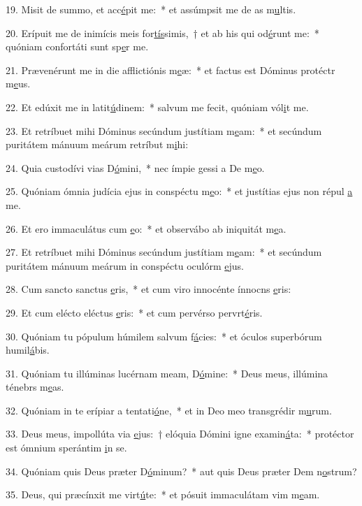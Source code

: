 19. Misit de summo, et acc\uline{é}pit me:~* et assúmpsit me de as m\uline{u}ltis.\par 
20. Erípuit me de inimícis meis for\uline{tís}simis,~† et ab his qui od\uline{é}runt me:~* quóniam confortáti sunt sp\uline{e}r me.\par 
21. Prævenérunt me in die afflictiónis m\uline{e}æ:~* et factus est Dóminus protéctr m\uline{e}us.\par 
22. Et edúxit me in latit\uline{ú}dinem:~* salvum me fecit, quóniam vól\uline{i}t me.\par 
23. Et retríbuet mihi Dóminus secúndum justítiam m\uline{e}am:~* et secúndum puritátem mánuum meárum retríbut m\uline{i}hi:\par 
24. Quia custodívi vias D\uline{ó}mini,~* nec ímpie gessi a De m\uline{e}o.\par 
25. Quóniam ómnia judícia ejus in conspéctu m\uline{e}o:~* et justítias ejus non répul \uline{a} me.\par 
26. Et ero immaculátus cum \uline{e}o:~* et observábo ab iniquitát m\uline{e}a.\par 
27. Et retríbuet mihi Dóminus secúndum justítiam m\uline{e}am:~* et secúndum puritátem mánuum meárum in conspéctu oculórm \uline{e}jus.\par 
28. Cum sancto sanctus \uline{e}ris,~* et cum viro innocénte ínnocns \uline{e}ris:\par 
29. Et cum elécto eléctus \uline{e}ris:~* et cum pervérso pervrt\uline{é}ris.\par 
30. Quóniam tu pópulum húmilem salvum f\uline{á}cies:~* et óculos superbórum humil\uline{á}bis.\par 
31. Quóniam tu illúminas lucérnam meam, D\uline{ó}mine:~* Deus meus, illúmina ténebrs m\uline{e}as.\par 
32. Quóniam in te erípiar a tentati\uline{ó}ne,~* et in Deo meo transgrédir m\uline{u}rum.\par 
33. Deus meus, impollúta via \uline{e}jus:~† elóquia Dómini igne examin\uline{á}ta:~* protéctor est ómnium sperántim \uline{i}n se.\par 
34. Quóniam quis Deus præter D\uline{ó}minum?~* aut quis Deus præter Dem n\uline{o}strum?\par 
35. Deus, qui præcínxit me virt\uline{ú}te:~* et pósuit immaculátam vim m\uline{e}am.\par 
